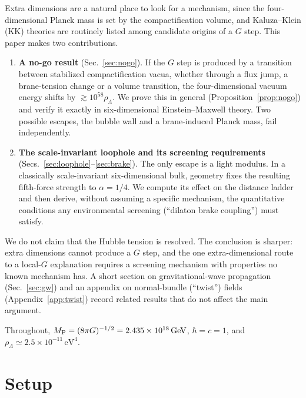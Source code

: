 \documentclass[aps,prd,reprint,superscriptaddress,nofootinbib,floatfix]{revtex4-2}
\theoremstyle{definition}
\newcommand{\MP}{M_{\rm P}}
\newcommand{\eV}{\,\mathrm{eV}}
\begin{document}
Extra dimensions are a natural place to look for a mechanism, since the four-dimensional Planck mass is set by the compactification volume, and Kaluza--Klein (KK) theories are routinely listed among candidate origins of a $G$ step. This paper makes two contributions.
\begin{enumerate}
\item \textbf{A no-go result} (Sec.~\ref{sec:nogo}). If the $G$ step is produced by a transition between stabilized compactification vacua, whether through a flux jump, a brane-tension change or a volume transition, the four-dimensional vacuum energy shifts by $\gtrsim10^{58}\rho_\Lambda$. We prove this in general (Proposition~\ref{prop:nogo}) and verify it exactly in six-dimensional Einstein--Maxwell theory. Two possible escapes, the bubble wall and a brane-induced Planck mass, fail independently.
\item \textbf{The scale-invariant loophole and its screening requirements} (Secs.~\ref{sec:loophole}--\ref{sec:brake}). The only escape is a light modulus. In a classically scale-invariant six-dimensional bulk, geometry fixes the resulting fifth-force strength to $\alpha=1/4$. We compute its effect on the distance ladder and then derive, without assuming a specific mechanism, the quantitative conditions any environmental screening (``dilaton brake coupling'') must satisfy.
\end{enumerate}
We do not claim that the Hubble tension is resolved. The conclusion is sharper: extra dimensions cannot produce a $G$ step, and the one extra-dimensional route to a local-$G$ explanation requires a screening mechanism with properties no known mechanism has. A short section on gravitational-wave propagation (Sec.~\ref{sec:gw}) and an appendix on normal-bundle (``twist'') fields (Appendix~\ref{app:twist}) record related results that do not affect the main argument.

Throughout, $\MP = (8\pi G)^{-1/2} = 2.435\times10^{18}\,\mathrm{GeV}$, $\hbar=c=1$, and $\rho_\Lambda \simeq 2.5\times10^{-11}\eV^4$.

\section{Setup}\label{sec:setup}
\end{document}
